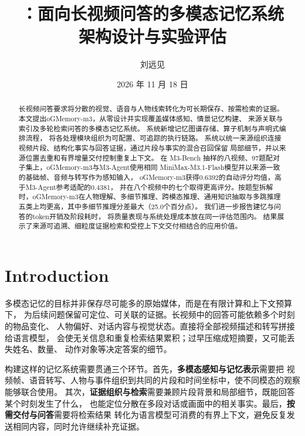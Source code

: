 \documentclass[UTF8,a4paper,11pt,fontset=fandol]{ctexart}
\title{\memoryprojectnamemthree{}：面向长视频问答的多模态记忆系统\\架构设计与实验评估}
\author{刘远见}
\date{2026 年 11 月 18 日}
\newcommand*{\memoryprojectname}{oGMemory}
\newcommand*{\memoryprojectnamemthree}{\memoryprojectname-m3}
\begin{document}
\maketitle
\begin{abstract}
长视频问答要求将分散的视觉、语音与人物线索转化为可长期保存、按需检索的证据。
本文提出\memoryprojectnamemthree{}，从零设计并实现覆盖媒体感知、情景记忆构建、
来源关联与索引及多轮检索问答的多模态记忆系统。
系统新增记忆图谱存储、算子机制与声明式编排流程，
将各处理模块组织为可配置、可追踪的执行链路。
系统以统一来源组织连接视频片段、结构化事实与回答证据，通过片段与事实的混合召回保留
局部细节，并以来源位置去重和有界增量交付控制重复上下文。
在 M3-Bench 抽样的八视频、97题配对子集上，\memoryprojectnamemthree{}与M3-Agent使用相同
MiniMax-M3.1-Flash模型并以来源一致的基础帧、音频与转写作为感知输入，
\memoryprojectnamemthree{}获得0.6392的自动评分均值，高于M3-Agent参考适配的0.4381，
并在八个视频中的七个取得更高评分。按题型拆解时，\memoryprojectnamemthree{}在人物理解、多细节推理、跨模态推理、通用知识抽取与多跳推理五类上均更高，其中多细节推理分差最大（25.0个百分点）。
我们进一步报告建忆与问答的token开销及阶段耗时，
将质量表现与系统处理成本放在同一评估范围内。
结果展示了来源可追溯、细粒度证据检索和受控上下文交付相结合的应用价值。
\end{abstract}

\section{Introduction}
多模态记忆的目标并非保存尽可能多的原始媒体，而是在有限计算和上下文预算下，
为后续问题保留可定位、可关联的证据。长视频中的回答可能依赖多个时刻的物品变化、
人物偏好、对话内容与视觉状态。直接将全部视频描述和转写拼接给语言模型，
会使无关信息和重复检索结果累积；过早压缩成短摘要，又可能丢失姓名、数量、
动作对象等决定答案的细节。

构建这样的记忆系统需要贯通三个环节。首先，\textbf{多模态感知与记忆表示}需要把
视频帧、语音转写、人物与事件组织到共同的片段和时间坐标中，使不同模态的观察能够联合使用。
其次，\textbf{证据组织与检索}需要兼顾片段背景和局部细节，既能回答某个时刻发生了什么，
也能定位分散在多段对话或画面中的相关事实。最后，\textbf{按需交付与问答}需要将检索结果
转化为语言模型可消费的有界上下文，避免反复发送相同内容，同时允许继续补充证据。
\end{document}
